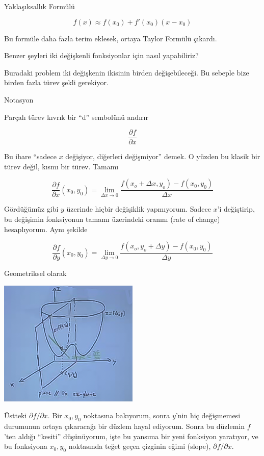 \documentclass[12pt,fleqn]{article}\usepackage{../../common}
\begin{document}
Yaklaşıksallık Formülü

$$ f(x) \approx f(x_0) + f'(x_0)(x-x_0) $$

Bu formüle daha fazla terim eklesek, ortaya Taylor Formülü çıkardı. 

Benzer şeyleri iki değişkenli fonksiyonlar için nasıl yapabiliriz?

Buradaki problem iki değişkenin ikisinin birden değişebileceği. Bu sebeple
bize birden fazla türev şekli gerekiyor. 

Notasyon

Parçalı türev kıvrık bir ``d'' sembolünü andırır

$$ \frac{\partial f}{\partial x} $$

Bu ibare ``sadece $x$ değişiyor, diğerleri değişmiyor'' demek. O yüzden bu
klasik bir türev değil, kısmı bir türev. Tamamı

$$ \frac{\partial f}{\partial x}(x_0,y_0) = 
\lim_{\Delta x \to 0} \frac{f(x_o+\Delta x, y_o) - f(x_0,y_0)}{\Delta x}
$$

Gördüğümüz gibi $y$ üzerinde hiçbir değişiklik yapmıyorum. Sadece $x$'i
değiştirip, bu değişimin fonksiyonun tamamı üzerindeki oranını (rate of
change) hesaplıyorum. Aynı şekilde

$$ \frac{\partial f}{\partial y}(x_0,y_0) = 
\lim_{\Delta y \to 0} \frac{f(x_o, y_o+\Delta y) - f(x_0,y_0)}{\Delta y}
 $$

Geometriksel olarak

\begin{center}
\includegraphics[height=6cm]{8_16.png}
\end{center}

Üstteki $\partial f / \partial x$. Bir $x_0,y_0$ noktasına bakıyorum, sonra
$y$'nin hiç değişmemesi durumunun ortaya çıkaracağı bir düzlem hayal
ediyorum. Sonra bu düzlemin $f$'ten aldığı ``kesiti'' düşünüyorum, işte bu
yansıma bir yeni fonksiyon yaratıyor, ve bu fonksiyona $x_0,y_0$ noktasında
teğet geçen çizginin eğimi (slope), $\partial f / \partial x$.
\end{document}
